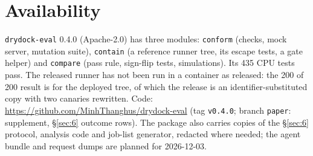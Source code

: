 \section{Availability}\label{sec:9}

\texttt{drydock-eval} 0.4.0 (Apache-2.0) has three modules: \texttt{conform} (checks, mock server, mutation suite), \texttt{contain} (a reference runner tree, its escape tests, a gate helper) and \texttt{compare} (pass rule, sign-flip tests, simulations). Its 435 CPU tests pass. The released runner has not been run in a container as released: the 200 of 200 result is for the deployed tree, of which the release is an identifier-substituted copy with two canaries rewritten. Code: \url{https://github.com/MinhThanghus/drydock-eval} (tag \texttt{v0.4.0}; branch \texttt{paper}: supplement, \S\ref{sec:6} outcome rows). The package also carries copies of the \S\ref{sec:6} protocol, analysis code and job-list generator, redacted where needed; the agent bundle and request dumps are planned for 2026-12-03.
